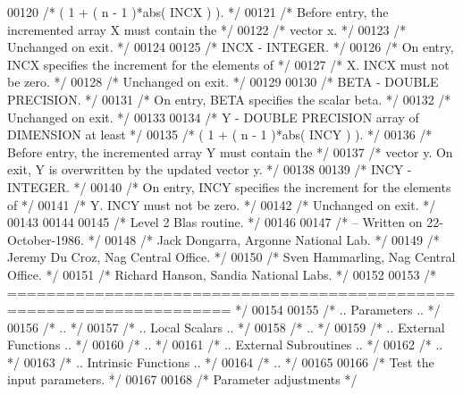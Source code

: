 \begin{DoxyCode}
00120 \textcolor{comment}{/*           ( 1 + ( n - 1 )*abs( INCX ) ). */}
00121 \textcolor{comment}{/*           Before entry, the incremented array X must contain the */}
00122 \textcolor{comment}{/*           vector x. */}
00123 \textcolor{comment}{/*           Unchanged on exit. */}
00124 
00125 \textcolor{comment}{/*  INCX   - INTEGER. */}
00126 \textcolor{comment}{/*           On entry, INCX specifies the increment for the elements of */}
00127 \textcolor{comment}{/*           X. INCX must not be zero. */}
00128 \textcolor{comment}{/*           Unchanged on exit. */}
00129 
00130 \textcolor{comment}{/*  BETA   - DOUBLE PRECISION. */}
00131 \textcolor{comment}{/*           On entry, BETA specifies the scalar beta. */}
00132 \textcolor{comment}{/*           Unchanged on exit. */}
00133 
00134 \textcolor{comment}{/*  Y      - DOUBLE PRECISION array of DIMENSION at least */}
00135 \textcolor{comment}{/*           ( 1 + ( n - 1 )*abs( INCY ) ). */}
00136 \textcolor{comment}{/*           Before entry, the incremented array Y must contain the */}
00137 \textcolor{comment}{/*           vector y. On exit, Y is overwritten by the updated vector y. */}
00138 
00139 \textcolor{comment}{/*  INCY   - INTEGER. */}
00140 \textcolor{comment}{/*           On entry, INCY specifies the increment for the elements of */}
00141 \textcolor{comment}{/*           Y. INCY must not be zero. */}
00142 \textcolor{comment}{/*           Unchanged on exit. */}
00143 
00144 
00145 \textcolor{comment}{/*  Level 2 Blas routine. */}
00146 
00147 \textcolor{comment}{/*  -- Written on 22-October-1986. */}
00148 \textcolor{comment}{/*     Jack Dongarra, Argonne National Lab. */}
00149 \textcolor{comment}{/*     Jeremy Du Croz, Nag Central Office. */}
00150 \textcolor{comment}{/*     Sven Hammarling, Nag Central Office. */}
00151 \textcolor{comment}{/*     Richard Hanson, Sandia National Labs. */}
00152 
00153 \textcolor{comment}{/*  ===================================================================== */}
00154 
00155 \textcolor{comment}{/*     .. Parameters .. */}
00156 \textcolor{comment}{/*     .. */}
00157 \textcolor{comment}{/*     .. Local Scalars .. */}
00158 \textcolor{comment}{/*     .. */}
00159 \textcolor{comment}{/*     .. External Functions .. */}
00160 \textcolor{comment}{/*     .. */}
00161 \textcolor{comment}{/*     .. External Subroutines .. */}
00162 \textcolor{comment}{/*     .. */}
00163 \textcolor{comment}{/*     .. Intrinsic Functions .. */}
00164 \textcolor{comment}{/*     .. */}
00165 
00166 \textcolor{comment}{/*     Test the input parameters. */}
00167 
00168     \textcolor{comment}{/* Parameter adjustments */}

\end{DoxyCode}
